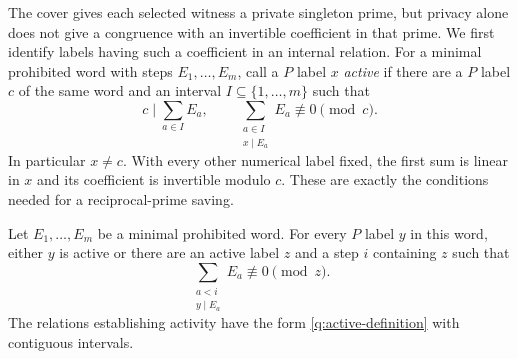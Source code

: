 The cover gives each selected witness a private singleton prime, but
privacy alone does not give a congruence with an invertible coefficient
in that prime.  We first identify labels having such a coefficient in
an internal relation.  For a minimal prohibited word with steps
$E_1,\ldots,E_m$, call a $P$ label $x$ \emph{active}
if there are a $P$ label $c$ of the same word and an interval
$I\subseteq\{1,\ldots,m\}$ such that
\begin{equation}\label{q:active-definition}
 c\mid\sum_{a\in I}E_a,
 \qquad
 \sum_{\substack{a\in I\\x\mid E_a}}E_a\not\equiv0\pmod c.
\end{equation}
In particular $x\ne c$.  With every other numerical label fixed, the
first sum is linear in $x$ and its coefficient is invertible modulo
$c$.  These are exactly the conditions needed for a reciprocal-prime
saving.

\begin{lemma}\label{q:active}
Let $E_1,\ldots,E_m$ be a minimal prohibited word.  For every $P$ label
$y$ in this word, either $y$ is active or there are an active label $z$
and a step $i$ containing $z$ such that
\begin{equation}\label{q:active-prefix}
 \sum_{\substack{a<i\\y\mid E_a}}E_a\not\equiv0\pmod z.
\end{equation}
The relations establishing activity have the form
\eqref{q:active-definition} with contiguous intervals.
\end{lemma}

